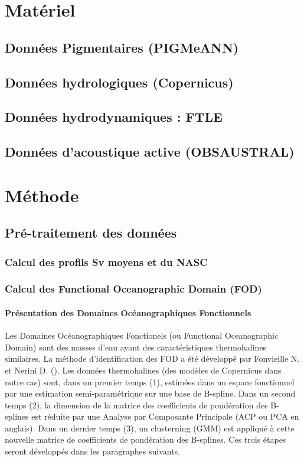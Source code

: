 \documentclass{article}
\begin{document}
	
	
	
	\clearpage
	\section{Matériel}
	\subsection{Données Pigmentaires (PIGMeANN)}
	\subsection{Données hydrologiques (Copernicus)}
	\subsection{Données hydrodynamiques : FTLE}
	\subsection{Données d'acoustique active (OBSAUSTRAL)}
	
	\clearpage
	\section{Méthode}
	\subsection{Pré-traitement des données}
	\subsubsection{Calcul des profils Sv moyens et du NASC}
	\subsubsection{Calcul des Functional Oceanographic Domain (FOD)}
		\paragraph{Présentation des Domaines Océanographiques Fonctionnels}
		Les Domaines Océanographiques Fonctionels (ou Functional Oceanographic Domain) sont des masses d'eau ayant des caractéristiques thermohalines similaires. La méthode d'identification des FOD a été développé par Fonvieille N. et Nerini D. (\cite{}). Les données thermohalines (des modèles de Copernicus dans notre cas) sont, dans un premier temps (1), estimées dans un espace fonctionnel par une estimation semi-paramétrique sur une base de B-spline. Dans un second temps (2), la dimension de la matrice des coefficients de pondération des B-splines est réduite par une Analyse par Composante Principale (ACP ou PCA en anglais). Dans un dernier temps (3), un clusterning (GMM) est appliqué à cette nouvelle matrice de coefficients de pondération des B-splines. Ces trois étapes seront développés dans les paragraphes suivants.
	
\end{document}
